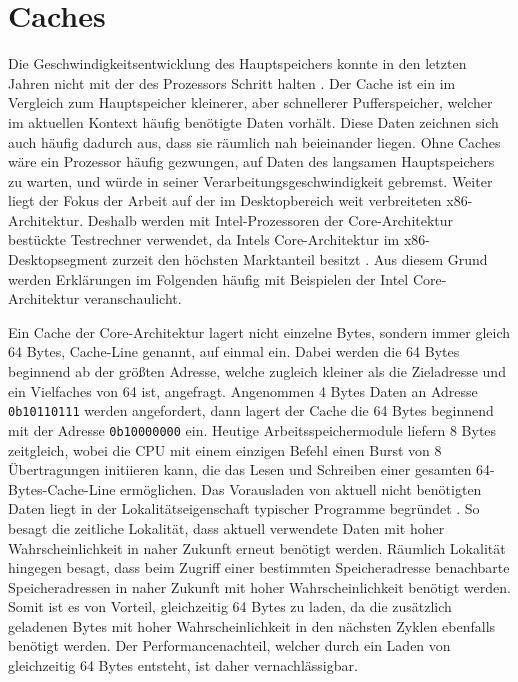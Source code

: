 \section{Caches}

Die Geschwindigkeitsentwicklung des Hauptspeichers konnte in den letzten Jahren nicht mit der des Prozessors Schritt halten \cite{speedGapCPUandRAM}. Der Cache ist ein im Vergleich zum Hauptspeicher kleinerer, aber schnellerer Pufferspeicher, welcher im aktuellen Kontext häufig benötigte Daten vorhält. Diese Daten zeichnen sich auch häufig dadurch aus, dass sie räumlich nah beieinander liegen.
Ohne Caches wäre ein Prozessor häufig gezwungen, auf Daten des langsamen Hauptspeichers zu warten, und würde in seiner Verarbeitungsgeschwindigkeit gebremst. %
Weiter liegt der Fokus der Arbeit auf der im Desktopbereich weit verbreiteten x86-Architektur. Deshalb werden mit Intel-Prozessoren der Core-Architektur bestückte Testrechner verwendet, da Intels Core-Architektur im x86-Desktopsegment zurzeit den höchsten Marktanteil besitzt \cite{AMDIntelMarketShare}. Aus diesem Grund werden Erklärungen im Folgenden häufig mit Beispielen der Intel Core-Architektur veranschaulicht.

Ein Cache der Core-Architektur lagert nicht einzelne Bytes, sondern immer gleich 64 Bytes, Cache-Line genannt, auf einmal ein. Dabei werden die 64 Bytes beginnend ab der größten Adresse, welche zugleich kleiner als die Zieladresse und ein Vielfaches von 64 ist, angefragt.
Angenommen 4 Bytes Daten an Adresse \lstinline!0b10110111!
werden angefordert, dann lagert der Cache die 64 Bytes beginnend mit der Adresse \lstinline!0b10000000! ein.
Heutige Arbeitsspeichermodule liefern 8 Bytes zeitgleich, wobei die CPU mit einem einzigen Befehl einen Burst von 8 Übertragungen initiieren kann, die das Lesen und Schreiben einer gesamten 64-Bytes-Cache-Line ermöglichen.
Das Vorausladen von aktuell nicht benötigten Daten liegt in der Lokalitätseigenschaft typischer Programme begründet \cite{tanenbaumLocality}. So besagt die zeitliche Lokalität, dass aktuell verwendete Daten mit hoher Wahrscheinlichkeit in naher Zukunft erneut benötigt werden. Räumlich Lokalität hingegen besagt, dass beim Zugriff einer bestimmten Speicheradresse benachbarte Speicheradressen in naher Zukunft mit hoher Wahrscheinlichkeit benötigt werden.
Somit ist es von Vorteil, gleichzeitig 64 Bytes zu laden, da die zusätzlich geladenen Bytes mit hoher Wahrscheinlichkeit in den nächsten Zyklen ebenfalls benötigt werden. Der Performancenachteil, welcher durch ein Laden von gleichzeitig 64 Bytes entsteht, ist daher vernachlässigbar.

